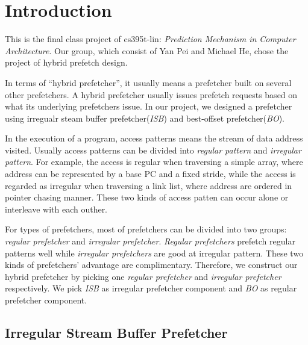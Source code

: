 \section{Introduction}
\label{sec:intro}

This is the final class project of cs395t-lin: \emph{Prediction Mechanism in Computer Architecture}. Our group, which consist of Yan Pei and Michael He, chose the project of hybrid prefetch design.

In terms of ``hybrid prefetcher'', it usually means a prefetcher built on several other prefetchers. A hybrid prefetcher usually issues prefetch requests based on what its underlying prefetchers issue. In our project, we designed a prefetcher using irregualr steam buffer prefetcher(\emph{ISB})\cite{isbpaper} and best-offset prefetcher(\emph{BO})\cite{bopaper}.

In the execution of a program, access patterns means the stream of data address visited. Usually access patterns can be divided into \emph{regular pattern} and \emph{irregular pattern}. For example, the access is regular when traversing a simple array, where address can be represented by a base PC and a fixed stride, while the access is regarded as irregular when traversing a link list, where address are ordered in pointer chasing manner. These two kinds of access patten can occur alone or interleave with each outher.

For types of prefetchers, most of prefetchers can be divided into two groups: \emph{regular prefetcher}\cite{bopaper, sandboxpaper} and \emph{irregular prefetcher}\cite{isbpaper, ghbpaper, reinforcementlearning}. \emph{Regular prefetchers} prefetch regular patterns well while \emph{irregular prefetchers} are good at irregular pattern. These two kinds of prefetchers' advantage are complimentary. Therefore, we construct our hybrid prefetcher by picking one \emph{regular prefetcher} and \emph{irregular prefetcher} respectively. We pick \emph{ISB}\cite{isbpaper} as irregular prefetcher component and \emph{BO}\cite{bopaper} as regular prefetcher component.

  \subsection{Irregular Stream Buffer Prefetcher}
  \label{sec:isbintro}

